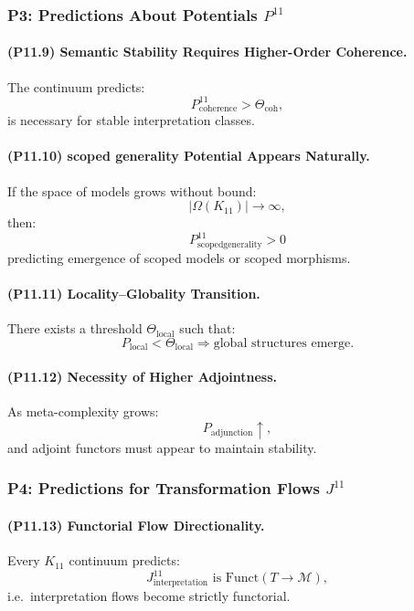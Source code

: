 \subsubsection{P3: Predictions About Potentials $P^{11}$}

\paragraph{(P11.9) Semantic Stability Requires Higher-Order Coherence.}
The continuum predicts:
\[
P_{\mathrm{coherence}}^{11} > \Theta_{\mathrm{coh}},
\]
is necessary for stable interpretation classes.

\paragraph{(P11.10) scoped generality Potential Appears Naturally.}
If the space of models grows without bound:
\[
|\Omega(K_{11})| \to \infty,
\]
then:
\[
P_{\mathrm{scoped generality}}^{11} > 0
\]
predicting emergence of scoped models or scoped morphisms.

\paragraph{(P11.11) Locality–Globality Transition.}
There exists a threshold $\Theta_{\mathrm{local}}$ such that:
\[
P_{\mathrm{local}} < \Theta_{\mathrm{local}}
\Rightarrow 
\text{global structures emerge}.
\]

\paragraph{(P11.12) Necessity of Higher Adjointness.}
As meta-complexity grows:
\[
P_{\mathrm{adjunction}} \uparrow,
\]
and adjoint functors must appear to maintain stability.

\subsubsection{P4: Predictions for Transformation Flows $J^{11}$}

\paragraph{(P11.13) Functorial Flow Directionality.}
Every $K_{11}$ continuum predicts:
\[
J_{\mathrm{interpretation}}^{11}
\text{ is } \mathrm{Funct}(T \to \mathcal{M}),
\]
i.e.\ interpretation flows become strictly functorial.

